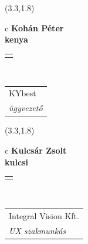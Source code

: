 \documentclass[11pt]{article}
\begin{document}
\makebox(3.3,1.8){
  \renewcommand\arraystretch{1.3}
  \begin{tabular}[c]{c}
    \hspace{8.5mm}
    \LARGE\bf{ Kohán Péter }\\
    \hspace{8.5mm}
    \Large{ kenya }\\
    \renewcommand\arraystretch{3}
    \begin{tabular}[c]{c}
      \centering
      \fontfamily{phv}\selectfont{
        \textbf{
          \textsc{
            \scriptsize{
            \color{Bright}{ Ismerkedő }\color{Dark}{ Webmester }\color{Bright}{ Sminkmester }\color{Bright}{ Programozó }
            }
          }
        }
      }
    \end{tabular}
    \\
    \renewcommand\arraystretch{1}
    \begin{tabular}{p{3.3in}}
      \hspace{.7cm}KYbest\\
      \hspace{.7cm}\emph{ ügyvezető }\\
    \end{tabular}
  \end{tabular}
}

\makebox(3.3,1.8){
  \renewcommand\arraystretch{1.3}
  \begin{tabular}[c]{c}
    \hspace{8.5mm}
    \LARGE\bf{ Kulcsár Zsolt }\\
    \hspace{8.5mm}
    \Large{ kulcsi }\\
    \renewcommand\arraystretch{3}
    \begin{tabular}[c]{c}
      \centering
      \fontfamily{phv}\selectfont{
        \textbf{
          \textsc{
            \scriptsize{
            \color{Bright}{ Ismerkedő }\color{Dark}{ Webmester }\color{Dark}{ Sminkmester }\color{Bright}{ Programozó }
            }
          }
        }
      }
    \end{tabular}
    \\
    \renewcommand\arraystretch{1}
    \begin{tabular}{p{3.3in}}
      \hspace{.7cm}Integral Vision Kft.\\
      \hspace{.7cm}\emph{ UX szakmunkás }\\
    \end{tabular}
  \end{tabular}
}
\end{document}
